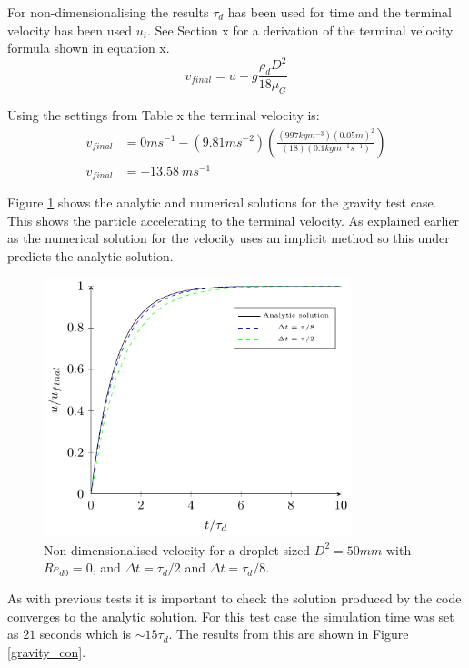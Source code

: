 \documentclass[../Interim_Report_Master]{subfiles}
\begin{document}
For non-dimensionalising the results $\tau_d$ has been used for time and the terminal velocity has been used $u_i$. See Section x for a derivation of the terminal velocity formula shown in equation x.
\begin{equation}
v_{final} = u - g\frac{\rho_d D^2}{18\mu_G}
\end{equation}

Using the settings from Table x the terminal velocity is:
\begin{subequations}
\begin{align}
v_{final} &= 0ms^{-1} - (9.81ms^{-2})\left(\frac{(997kgm^{-3})(0.05m)^2}{(18)(0.1kgm^{-1}s^{-1})}\right) \\
v_{final} &= -13.58~ms^{-1}
\end{align}
\end{subequations}

Figure \ref{vel_time_tau_4} shows the analytic and numerical solutions for the gravity test case. This shows the particle accelerating to the terminal velocity. As explained earlier as the numerical solution for the velocity uses an implicit method so this under predicts the analytic solution.
\begin{figure}[H]
	\centering
	\includegraphics[width=0.8\textwidth]{./Diagrams/Gravity_Verification_Test/Gravity_Verification_Test.pdf}
	\caption{Non-dimensionalised velocity for a droplet sized $D^2=50mm$ with $Re_{d0}=0$, and $\Delta t=\tau_d/2$ and $\Delta t=\tau_d/8$.}
	\label{vel_time_tau_4}
\end{figure}

As with previous tests it is important to check the solution produced by the code converges to the analytic solution. For this test case the simulation time was set as $21$ seconds which is $\sim15\tau_d$. The results from this are shown in Figure \ref{gravity_con}.
\end{document}
